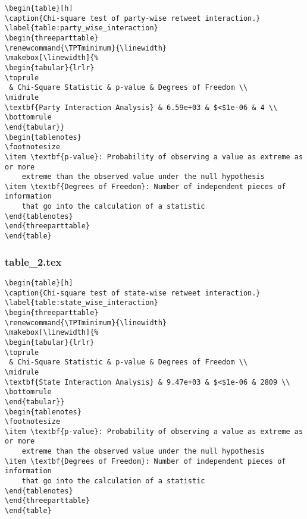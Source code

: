 \documentclass[11pt]{article}
\begin{document}
\begin{Verbatim}[tabsize=4]
\begin{table}[h]
\caption{Chi-square test of party-wise retweet interaction.}
\label{table:party_wise_interaction}
\begin{threeparttable}
\renewcommand{\TPTminimum}{\linewidth}
\makebox[\linewidth]{%
\begin{tabular}{lrlr}
\toprule
 & Chi-Square Statistic & p-value & Degrees of Freedom \\
\midrule
\textbf{Party Interaction Analysis} & 6.59e+03 & $<$1e-06 & 4 \\
\bottomrule
\end{tabular}}
\begin{tablenotes}
\footnotesize
\item \textbf{p-value}: Probability of observing a value as extreme as or more
	extreme than the observed value under the null hypothesis
\item \textbf{Degrees of Freedom}: Number of independent pieces of information
	that go into the calculation of a statistic
\end{tablenotes}
\end{threeparttable}
\end{table}

\end{Verbatim}

\subsubsection*{table\_2.tex}

\begin{Verbatim}[tabsize=4]
\begin{table}[h]
\caption{Chi-square test of state-wise retweet interaction.}
\label{table:state_wise_interaction}
\begin{threeparttable}
\renewcommand{\TPTminimum}{\linewidth}
\makebox[\linewidth]{%
\begin{tabular}{lrlr}
\toprule
 & Chi-Square Statistic & p-value & Degrees of Freedom \\
\midrule
\textbf{State Interaction Analysis} & 9.47e+03 & $<$1e-06 & 2809 \\
\bottomrule
\end{tabular}}
\begin{tablenotes}
\footnotesize
\item \textbf{p-value}: Probability of observing a value as extreme as or more
	extreme than the observed value under the null hypothesis
\item \textbf{Degrees of Freedom}: Number of independent pieces of information
	that go into the calculation of a statistic
\end{tablenotes}
\end{threeparttable}
\end{table}

\end{Verbatim}
\end{document}
